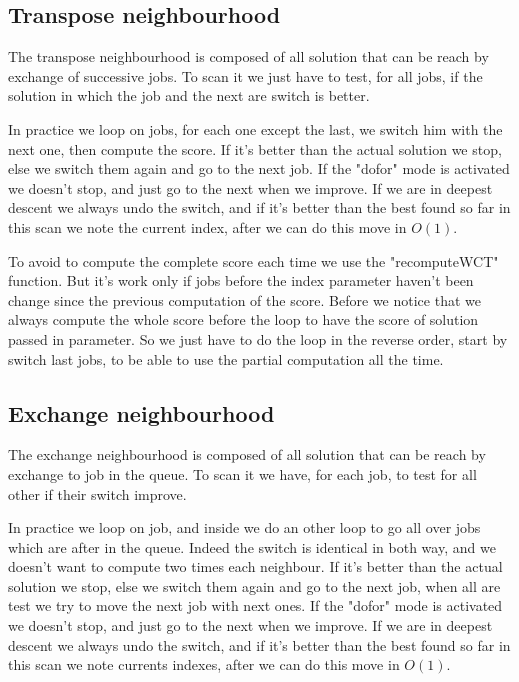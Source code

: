 \documentclass[12pt,a4paper]{article}
\begin{document}
\subsection{Transpose neighbourhood}

The transpose neighbourhood is composed of all solution that can be reach by exchange of successive jobs. To scan it we just have to test, for all jobs, if the solution in which the job and the next are switch is better.

In practice we loop on jobs, for each one except the last, we switch him with the next one, then compute the score. If it's better than the actual solution we stop, else we switch them again and go to the next job. If the "dofor" mode is activated we doesn't stop, and just go to the next when we improve. If we are in deepest descent we always undo the switch, and if it's better than the best found so far in this scan we note the current index, after we can do this move in $O(1)$.

To avoid to compute the complete score each time we use the "recomputeWCT" function. But it's work only if jobs before the index parameter haven't been change since the previous computation of the score. Before we notice that we always compute the whole score before the loop to have the score of solution passed in parameter. So we just have to do the loop in the reverse order, start by switch last jobs, to be able to use the partial computation all the time.

\subsection{Exchange neighbourhood}

The exchange neighbourhood is composed of all solution that can be reach by exchange to job in the queue. To scan it we have, for each job, to test for all other if their switch improve.

In practice we loop on job, and inside we do an other loop to go all over jobs which are after in the queue. Indeed the switch is identical in both way, and we doesn't want to compute two times each neighbour. If it's better than the actual solution we stop, else we switch them again and go to the next job, when all are test we try to move the next job with next ones. If the "dofor" mode is activated we doesn't stop, and just go to the next when we improve. If we are in deepest descent we always undo the switch, and if it's better than the best found so far in this scan we note currents indexes, after we can do this move in $O(1)$.
\end{document}

